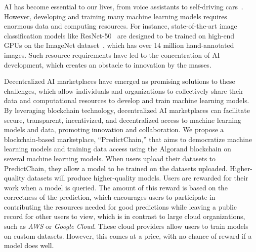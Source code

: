 \documentclass{ledger}
\begin{document}
AI has become essential to our lives, from voice assistants to self-driving cars~\cite{whittaker2018ai}. However, developing and training many machine learning models requires enormous data and computing resources. For instance, state-of-the-art image classification models like ResNet-50~\cite{tai2017image} are designed to be trained on high-end GPUs on the ImageNet dataset~\cite{deng2009imagenet}, which has over 14 million hand-annotated images. Such resource requirements have led to the concentration of AI development, which creates an obstacle to innovation by the masses.

Decentralized AI marketplaces have emerged as promising solutions to these challenges, which allow individuals and organizations to collectively share their data and computational resources to develop and train machine learning models. By leveraging blockchain technology, decentralized AI marketplaces can facilitate secure, transparent, incentivized, and decentralized access to machine learning models and data, promoting innovation and collaboration. We propose a blockchain-based marketplace, ``PredictChain,'' that aims to democratize machine learning models and training data access using the Algorand blockchain on several machine learning models.
When users upload their datasets to PredictChain, they allow a model to be trained on the datasets uploaded. Higher-quality datasets will produce higher-quality models. Users are rewarded for their work when a model is queried. The amount of this reward is based on the correctness of the prediction, which encourages users to participate in contributing the resources needed for good predictions while leaving a public record for other users to view, which is in contrast to large cloud organizations, such as \textit{AWS} or \textit{Google Cloud}. These cloud providers allow users to train models on custom datasets. However, this comes at a price, with no chance of reward if a model does well.
\end{document}
